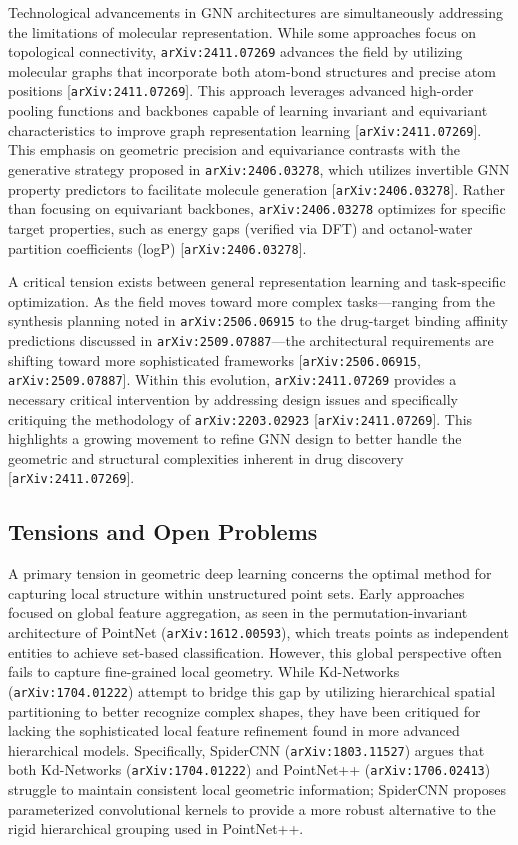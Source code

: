 \documentclass[11pt]{article}
\begin{document}
Technological advancements in GNN architectures are simultaneously addressing the limitations of molecular representation. While some approaches focus on topological connectivity, \texttt{arXiv:2411.07269} advances the field by utilizing molecular graphs that incorporate both atom-bond structures and precise atom positions [\texttt{arXiv:2411.07269}]. This approach leverages advanced high-order pooling functions and backbones capable of learning invariant and equivariant characteristics to improve graph representation learning [\texttt{arXiv:2411.07269}]. This emphasis on geometric precision and equivariance contrasts with the generative strategy proposed in \texttt{arXiv:2406.03278}, which utilizes invertible GNN property predictors to facilitate molecule generation [\texttt{arXiv:2406.03278}]. Rather than focusing on equivariant backbones, \texttt{arXiv:2406.03278} optimizes for specific target properties, such as energy gaps (verified via DFT) and octanol-water partition coefficients (logP) [\texttt{arXiv:2406.03278}].

A critical tension exists between general representation learning and task-specific optimization. As the field moves toward more complex tasks—ranging from the synthesis planning noted in \texttt{arXiv:2506.06915} to the drug-target binding affinity predictions discussed in \texttt{arXiv:2509.07887}—the architectural requirements are shifting toward more sophisticated frameworks [\texttt{arXiv:2506.06915}, \texttt{arXiv:2509.07887}]. Within this evolution, \texttt{arXiv:2411.07269} provides a necessary critical intervention by addressing design issues and specifically critiquing the methodology of \texttt{arXiv:2203.02923} [\texttt{arXiv:2411.07269}]. This highlights a growing movement to refine GNN design to better handle the geometric and structural complexities inherent in drug discovery [\texttt{arXiv:2411.07269}].

\subsection{Tensions and Open Problems}

A primary tension in geometric deep learning concerns the optimal method for capturing local structure within unstructured point sets. Early approaches focused on global feature aggregation, as seen in the permutation-invariant architecture of PointNet (\texttt{arXiv:1612.00593}), which treats points as independent entities to achieve set-based classification. However, this global perspective often fails to capture fine-grained local geometry. While Kd-Networks (\texttt{arXiv:1704.01222}) attempt to bridge this gap by utilizing hierarchical spatial partitioning to better recognize complex shapes, they have been critiqued for lacking the sophisticated local feature refinement found in more advanced hierarchical models. Specifically, SpiderCNN (\texttt{arXiv:1803.11527}) argues that both Kd-Networks (\texttt{arXiv:1704.01222}) and PointNet++ (\texttt{arXiv:1706.02413}) struggle to maintain consistent local geometric information; SpiderCNN proposes parameterized convolutional kernels to provide a more robust alternative to the rigid hierarchical grouping used in PointNet++.
\end{document}
